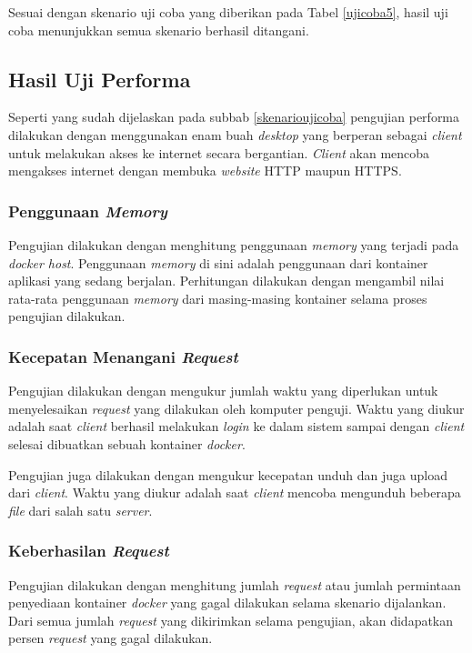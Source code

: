 Sesuai dengan skenario uji coba yang diberikan pada Tabel \ref{ujicoba5}, hasil uji coba menunjukkan semua skenario berhasil ditangani.

\subsection{Hasil Uji Performa}
Seperti yang sudah dijelaskan pada subbab \ref{skenarioujicoba} pengujian performa dilakukan dengan menggunakan enam buah \textit{desktop} yang berperan sebagai \textit{client} untuk melakukan akses ke internet secara bergantian. \textit{Client} akan mencoba mengakses internet dengan membuka \textit{website} HTTP maupun HTTPS.

\subsubsection{Penggunaan \textit{Memory}}
Pengujian dilakukan dengan menghitung penggunaan \textit{memory} yang terjadi pada \textit{docker host}. Penggunaan \textit{memory} di sini adalah penggunaan dari kontainer aplikasi yang sedang berjalan. Perhitungan dilakukan dengan mengambil nilai rata-rata penggunaan \textit{memory} dari masing-masing kontainer selama proses pengujian dilakukan.

\subsubsection{Kecepatan Menangani \textit{Request}}
Pengujian dilakukan dengan mengukur jumlah waktu yang diperlukan untuk menyelesaikan \textit{request} yang dilakukan oleh komputer penguji. Waktu yang diukur adalah saat \textit{client} berhasil melakukan \textit{login} ke dalam sistem sampai dengan \textit{client} selesai dibuatkan sebuah kontainer \textit{docker}.

Pengujian juga dilakukan dengan mengukur kecepatan unduh dan juga upload dari \textit{client}. Waktu yang diukur adalah saat \textit{client} mencoba mengunduh beberapa \textit{file} dari salah satu \textit{server}.

\subsubsection{Keberhasilan \textit{Request}}
Pengujian dilakukan dengan menghitung jumlah \textit{request} atau jumlah permintaan penyediaan kontainer \textit{docker} yang gagal dilakukan selama skenario dijalankan. Dari semua jumlah \textit{request} yang dikirimkan selama pengujian, akan didapatkan persen \textit{request} yang gagal dilakukan.


